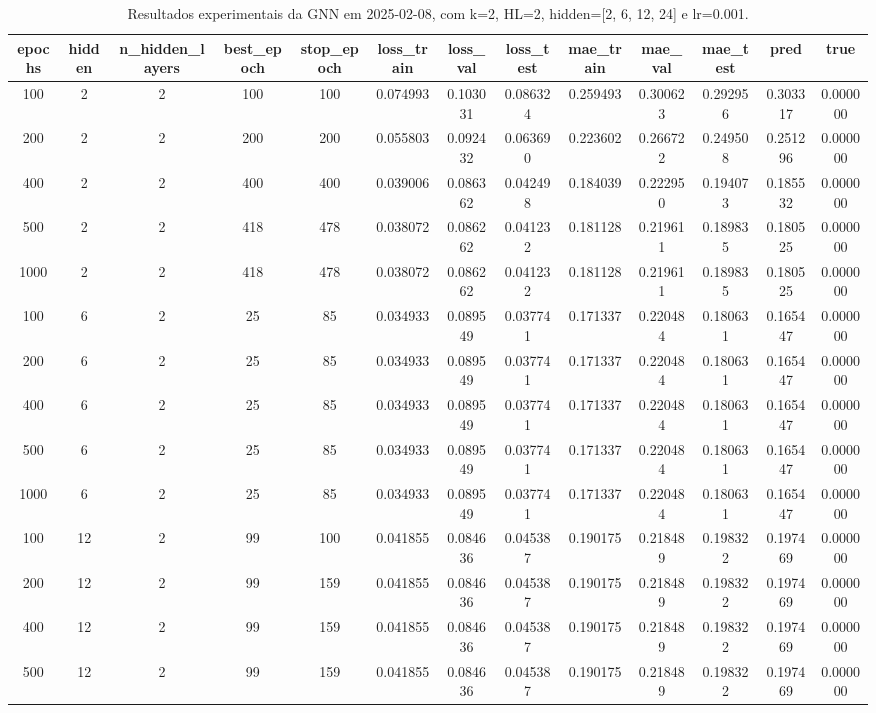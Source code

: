 \begin{table}[h]
\centering
\caption{Resultados experimentais da GNN em 2025-02-08, com k=2, HL=2, hidden=[2, 6, 12, 24] e lr=0.001.}
\label{tab:gnn_results_k2_hl2_d20250208}
\begin{tabular}{ccccccccccccc}
\toprule
epochs & hidden & n\_hidden\_layers & best\_epoch & stop\_epoch & loss\_train & loss\_val & loss\_test & mae\_train & mae\_val & mae\_test & pred & true \\
\midrule
100 & 2 & 2 & 100 & 100 & 0.074993 & 0.103031 & 0.086324 & 0.259493 & 0.300623 & 0.292956 & 0.303317 & 0.000000 \\
200 & 2 & 2 & 200 & 200 & 0.055803 & 0.092432 & 0.063690 & 0.223602 & 0.266722 & 0.249508 & 0.251296 & 0.000000 \\
400 & 2 & 2 & 400 & 400 & 0.039006 & 0.086362 & 0.042498 & 0.184039 & 0.222950 & 0.194073 & 0.185532 & 0.000000 \\
500 & 2 & 2 & 418 & 478 & 0.038072 & 0.086262 & 0.041232 & 0.181128 & 0.219611 & 0.189835 & 0.180525 & 0.000000 \\
1000 & 2 & 2 & 418 & 478 & 0.038072 & 0.086262 & 0.041232 & 0.181128 & 0.219611 & 0.189835 & 0.180525 & 0.000000 \\
100 & 6 & 2 & 25 & 85 & 0.034933 & 0.089549 & 0.037741 & 0.171337 & 0.220484 & 0.180631 & 0.165447 & 0.000000 \\
200 & 6 & 2 & 25 & 85 & 0.034933 & 0.089549 & 0.037741 & 0.171337 & 0.220484 & 0.180631 & 0.165447 & 0.000000 \\
400 & 6 & 2 & 25 & 85 & 0.034933 & 0.089549 & 0.037741 & 0.171337 & 0.220484 & 0.180631 & 0.165447 & 0.000000 \\
500 & 6 & 2 & 25 & 85 & 0.034933 & 0.089549 & 0.037741 & 0.171337 & 0.220484 & 0.180631 & 0.165447 & 0.000000 \\
1000 & 6 & 2 & 25 & 85 & 0.034933 & 0.089549 & 0.037741 & 0.171337 & 0.220484 & 0.180631 & 0.165447 & 0.000000 \\
100 & 12 & 2 & 99 & 100 & 0.041855 & 0.084636 & 0.045387 & 0.190175 & 0.218489 & 0.198322 & 0.197469 & 0.000000 \\
200 & 12 & 2 & 99 & 159 & 0.041855 & 0.084636 & 0.045387 & 0.190175 & 0.218489 & 0.198322 & 0.197469 & 0.000000 \\
400 & 12 & 2 & 99 & 159 & 0.041855 & 0.084636 & 0.045387 & 0.190175 & 0.218489 & 0.198322 & 0.197469 & 0.000000 \\
500 & 12 & 2 & 99 & 159 & 0.041855 & 0.084636 & 0.045387 & 0.190175 & 0.218489 & 0.198322 & 0.197469 & 0.000000 \\

\end{tabular}
\end{table}

